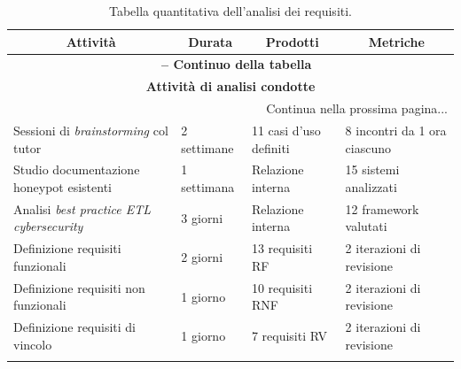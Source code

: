 \begin{center}
\begin{longtable}{|p{}|p{}|p{}|p{}|}
\hline
\multicolumn{1}{|c|}{\textbf{Attività}} & 
\multicolumn{1}{c|}{\textbf{Durata}} & 
\multicolumn{1}{c|}{\textbf{Prodotti}} & 
\multicolumn{1}{c|}{\textbf{Metriche}} \\ 
\hline
\endfirsthead

\multicolumn{4}{c}{{\bfseries \tablename\ \thetable{} -- Continuo della tabella}}\\
\hline
\multicolumn{4}{|c|}{\textbf{Attività di analisi condotte}} \\ \hline
\endhead

\hline \multicolumn{4}{|r|}{{Continua nella prossima pagina...}} \\ \hline
\endfoot

\endlastfoot

Sessioni di \textit{brainstorming} col tutor & 2 settimane & 11 casi d'uso definiti & 8 incontri da 1 ora ciascuno \\ \hline
Studio documentazione honeypot esistenti & 1 settimana & Relazione interna & 15 sistemi analizzati \\ \hline
Analisi \textit{best practice ETL cybersecurity} & 3 giorni & Relazione interna & 12 framework valutati \\ \hline
Definizione requisiti funzionali & 2 giorni & 13 requisiti RF & 2 iterazioni di revisione \\ \hline
Definizione requisiti non funzionali & 1 giorno & 10 requisiti RNF & 2 iterazioni di revisione \\ \hline
Definizione requisiti di vincolo & 1 giorno & 7 requisiti RV & 2 iterazioni di revisione \\ \hline

\caption{Tabella quantitativa dell'analisi dei requisiti.}
\label{tab:tempistiche-analisi}
\end{longtable}
\end{center}